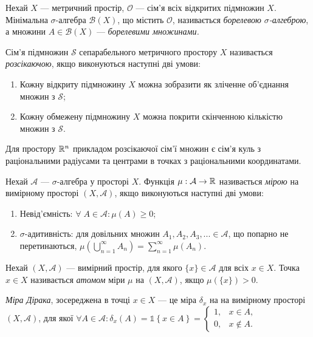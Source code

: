 \begin{definition}
    Нехай $X$ --- метричний простір, $\mathcal{O}$ ---
    сім'я всіх відкритих підмножин $X$. Мінімальна $\sigma$-алгебра
    $\mathcal{B}(X)$, що містить $\mathcal{O}$, називається
    \emph{борелевою $\sigma$-алгеброю}, а множини
    $A \in \mathcal{B}(X)$ --- \emph{борелевими множинами.}
\end{definition}
\begin{definition}
    Сім'я підмножин $\mathcal{S}$ сепарабельного метричного простору $X$ називається
    \emph{розсікаючою}, якщо виконуються наступні дві умови:
    \begin{enumerate}
        \item Кожну відкриту підмножину $X$ можна зобразити як зліченне об'єднання множин з $\mathcal{S}$;
        \item Кожну обмежену підмножину $X$ можна покрити скінченною кількістю множин з $\mathcal{S}$.
    \end{enumerate}
    Для простору $\mathbb{R}^n$ прикладом розсікаючої сім'ї множин є сім'я куль з
    раціональними радіусами та центрами в точках з раціональними координатами.
\end{definition}
\begin{definition}
    Нехай $\mathcal{A}$ --- $\sigma$-алгебра
    у просторі $X$. Функція $\mu: \mathcal{A} \to \mathbb{R}$ називається
    \emph{мірою} на вимірному просторі $\left(X, \mathcal{A}\right)$, якщо виконуються наступні дві умови:
    \begin{enumerate}
        \item Невід'ємність: $\forall \; A \in \mathcal{A} : \mu(A) \geq 0$;
        \item $\sigma$-адитивність: для довільних множин $A_1, A_2, A_3, ... \in \mathcal{A}$,
        що попарно не перетинаються, 
        $\mu\left(\bigcup_{n=1}^{\infty} A_n\right) = \sum_{n=1}^{\infty}\mu(A_n)$.
    \end{enumerate}
\end{definition}
\begin{definition}
    Нехай $\left(X, \mathcal{A}\right)$ --- вимірний простір, для якого $\{ x \} \in \mathcal{A}$
    для всіх $x \in X$.
    Точка $x \in X$ називається \emph{атомом} міри $\mu$ на
    $\left(X, \mathcal{A}\right)$, якщо $\mu\left(\{x \}\right) > 0$.
\end{definition}
\begin{definition}
    \emph{Міра Дірака}, зосереджена
    в точці $x \in X$ --- це міра $\delta_x$ на 
    на вимірному просторі $\left(X, \mathcal{A}\right)$,
    для якої $\forall A \in \mathcal{A}: \delta_x(A) = \mathds{1}\left\{x \in A\right\} = 
    \begin{cases}
        1, & x \in A, \\
        0, & x \notin A.
    \end{cases}$
\end{definition}
